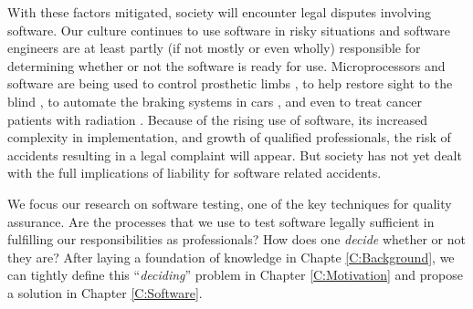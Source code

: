 With these factors mitigated, society will encounter legal disputes involving
software. Our culture continues to use software in risky situations and software
engineers are at least partly (if not mostly or even wholly) responsible for
determining whether or not the software is ready for use. Microprocessors and
software are being used to control prosthetic limbs \cite{Graupe78}, to help
restore sight to the blind \cite{Fox95}, to automate the braking systems in cars
\cite{Hurtig94}, and even to treat cancer patients with radiation 
\cite{Leveson93}. Because of the rising use of software, its increased 
complexity in implementation, and growth of qualified professionals, the risk of
accidents resulting in a legal complaint will appear. But society has not yet
dealt with the full implications of liability for software related accidents.

We focus our research on software testing, one of the key techniques for quality
assurance. Are the processes that we use to test software legally sufficient in
fulfilling our responsibilities as professionals? How does one \textit{decide}
whether or not they are? After laying a foundation of knowledge in Chapte
\ref{C:Background}, we can tightly define this ``\textit{deciding}'' problem in
Chapter \ref{C:Motivation} and propose a solution in Chapter \ref{C:Software}.
